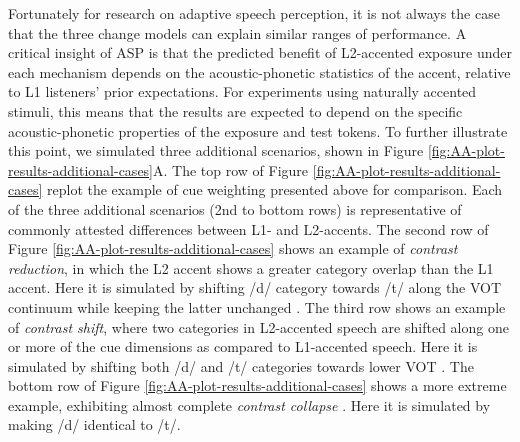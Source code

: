 \documentclass[
  11pt,
  man,floatsintext]{apa6}
\begin{document}
Fortunately for research on adaptive speech perception, it is not always the case that the three change models can explain similar ranges of performance. A critical insight of ASP is that the predicted benefit of L2-accented exposure under each mechanism depends on the acoustic-phonetic statistics of the accent, relative to L1 listeners' prior expectations. For experiments using naturally accented stimuli, this means that the results are expected to depend on the specific acoustic-phonetic properties of the exposure and test tokens. To further illustrate this point, we simulated three additional scenarios, shown in Figure \ref{fig:AA-plot-results-additional-cases}A. The top row of Figure \ref{fig:AA-plot-results-additional-cases} replot the example of cue weighting presented above for comparison. Each of the three additional scenarios (2nd to bottom rows) is representative of commonly attested differences between L1- and L2-accents. The second row of Figure \ref{fig:AA-plot-results-additional-cases} shows an example of \emph{contrast reduction}, in which the L2 accent shows a greater category overlap than the L1 accent. Here it is simulated by shifting /d/ category towards /t/ along the VOT continuum while keeping the latter unchanged \autocite[as qualitatively attested for, e.g., vowels in Spanish-accented English,][]{wade2007}. The third row shows an example of \emph{contrast shift}, where two categories in L2-accented speech are shifted along one or more of the cue dimensions as compared to L1-accented speech. Here it is simulated by shifting both /d/ and /t/ categories towards lower VOT \autocite[qualitatively attested for, e.g., word-initial stops in French-accented English,][]{sumner2011}. The bottom row of Figure \ref{fig:AA-plot-results-additional-cases} shows a more extreme example, exhibiting almost complete \emph{contrast collapse} \autocite[similar to the loss of the /s/-// contrast that can occur in Mandarin-accented English,][]{zheng-samuel2020}. Here it is simulated by making /d/ identical to /t/.
\end{document}
